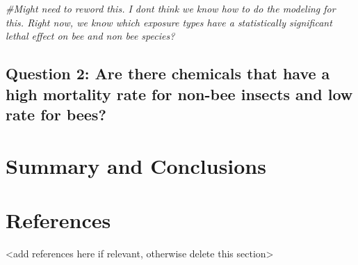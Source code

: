 \documentclass[
  12pt,
]{article}
\newenvironment{Shaded}{\begin{snugshade}}{\end{snugshade}}
\newcommand{\CommentTok}[1]{\textcolor[rgb]{0.56,0.35,0.01}{\textit{#1}}}
\begin{document}
\begin{Shaded}
\begin{Highlighting}[]
\CommentTok{\#Might need to reword this. I don\textquotesingle{}t think we know how to do the modeling for this. Right now, we know which exposure types have a statistically significant lethal effect on bee and non bee species?}
\end{Highlighting}
\end{Shaded}

\hypertarget{question-2-are-there-chemicals-that-have-a-high-mortality-rate-for-non-bee-insects-and-low-rate-for-bees}{%
\subsection{Question 2: Are there chemicals that have a high mortality
rate for non-bee insects and low rate for
bees?}\label{question-2-are-there-chemicals-that-have-a-high-mortality-rate-for-non-bee-insects-and-low-rate-for-bees}}

\newpage

\hypertarget{summary-and-conclusions}{%
\section{Summary and Conclusions}\label{summary-and-conclusions}}

\newpage

\hypertarget{references}{%
\section{References}\label{references}}

\textless add references here if relevant, otherwise delete this
section\textgreater{}
\end{document}
